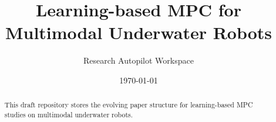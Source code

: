 \documentclass[11pt]{article}
\title{Learning-based MPC for Multimodal Underwater Robots}
\author{Research Autopilot Workspace}
\date{\today}
\begin{document}
\maketitle

\begin{abstract}
This draft repository stores the evolving paper structure for learning-based MPC studies on multimodal underwater robots.
\end{abstract}










\end{document}
